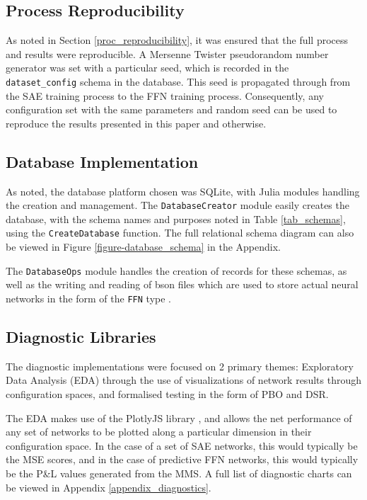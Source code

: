 \documentclass[a4paper,11pt,oneside]{article}
\theoremstyle{plain}
\theoremstyle{definition}
\begin{document}
	\subsection{Process Reproducibility}
	
	As noted in Section \ref{proc_reproducibility}, it was ensured that the full process and results were reproducible. A Mersenne Twister pseudorandom number generator was set with a particular seed, which is recorded in the \texttt{dataset\_config} schema in the database. This seed is propagated through from the SAE training process to the FFN training process. Consequently, any configuration set with the same parameters and random seed can be used to reproduce the results presented in this paper and otherwise.
	
	\subsection{Database Implementation}\label{software_database}
	
	As noted, the database platform chosen was SQLite, with Julia modules handling the creation and management. The \texttt{DatabaseCreator} module \citep{DCDatabaseCreator} easily creates the database, with the schema names and purposes noted in Table \ref{tab_schemas}, using the \texttt{CreateDatabase} function. The full relational schema diagram can also be viewed in Figure \ref{figure-database_schema} in the Appendix. \newline
	
	The \texttt{DatabaseOps} module \citep{DCDatabaseOps} handles the creation of records for these schemas, as well as the writing and reading of bson files which are used to store actual neural networks in the form of the \texttt{FFN} type \citep{DCFFN}.
	
	\subsection{Diagnostic Libraries}
	
	The diagnostic implementations were focused on 2 primary themes: Exploratory Data Analysis (EDA) through the use of visualizations of network results through configuration spaces, and formalised testing in the form of PBO and DSR.\newline
	
	The EDA makes use of the PlotlyJS library \citep{PlotlyJS}, and allows the net performance of any set of networks to be plotted along a particular dimension in their configuration space. In the case of a set of SAE networks, this would typically be the MSE scores, and in the case of predictive FFN networks, this would typically be the P\&L values generated from the MMS. A full list of diagnostic charts can be viewed in Appendix \ref{appendix_diagnostics}. \newline
	
\end{document}
